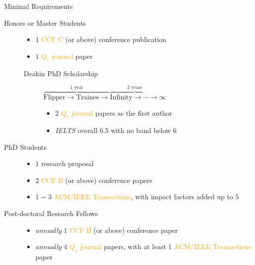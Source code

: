 \documentclass[
 size=14pt,
 paper=smartboard,  %
 mode=present, 		%
 display=slides, 	%
 style=tuliplab,  	%
 pauseslide,
 fleqn,leqno]{powerdot}{}
\begin{document}
\begin{slide}{Minimal Requirements}
\begin{description}
\item[Honors or Master Students]
    \begin{itemize}
        \item $1$ \textcolor{orange}{CCF C} (or above) conference publication
        \item $1$ \textcolor{orange}{$Q_1$ journal} paper
    \end{itemize}
    \begin{description}
  		\item[Deakin PhD Scholarship]
$\overbrace{\text{Flipper} \rightarrow \text{Trainee} \rightarrow}^{\text{1 year}}
\overbrace{\text{Infinity} \rightarrow \cdots \rightarrow }^{\text{2 years}} \infty$
    		\begin{itemize}
        		\item $2$ \textcolor{orange}{$Q_1$ journal} papers as the first author
        		\item \textit{IELTS} overall $6.5$ with no band below $6$
    		\end{itemize}
	\end{description}


\item[PhD Students]
    \begin{itemize}
        \item $1$ research proposal
        \item $2$ \textcolor{orange}{CCF B} (or above) conference papers
        \item $1 \backsim 3$ \textcolor{orange}{ACM/IEEE Transactions},
        with impact factors added up to $5$
    \end{itemize}

\item[Post-doctoral Research Fellows]
    \begin{itemize}
    \item \textit{annually} $1$ \textcolor{orange}{CCF B} (or above) conference paper
    \item \textit{annually} $4$ \textcolor{orange}{$Q_1$ journal} papers,
     with at least $1$ \textcolor{orange}{ACM/IEEE Transactions} paper
    \end{itemize}

\end{description}
\end{slide}
\end{document}
